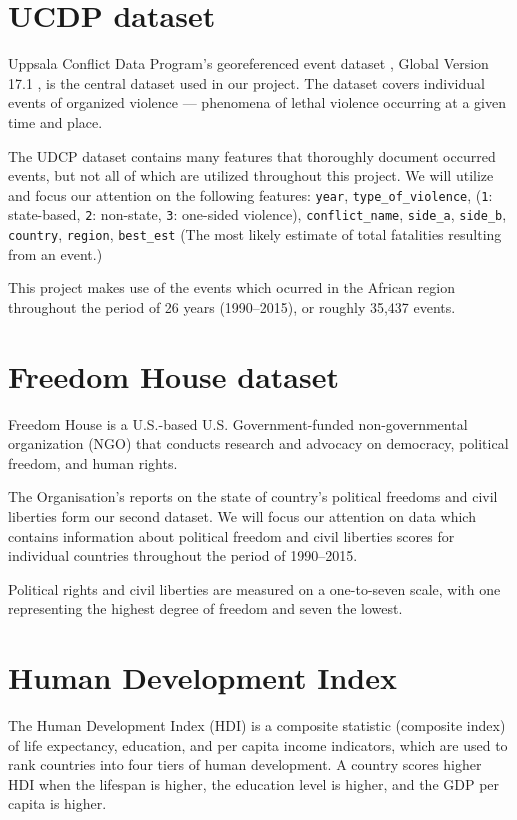 \documentclass[a4paper,11pt]{article}
\begin{document}
\section{UCDP dataset}

Uppsala Conflict Data Program's georeferenced event dataset \cite{Sundberg:13},
Global Version 17.1 \cite{Codebook2017}, is the central dataset used in our project.
The dataset covers individual events of organized violence --- phenomena of
lethal violence occurring at a given time and place.

The UDCP dataset contains many features that thoroughly document occurred
events, but not all of which are utilized throughout this project. We
will utilize and focus our attention on the following features:
\texttt{year}, \texttt{type\_of\_violence},
(\texttt{1}: state-based, \texttt{2}: non-state, \texttt{3}: one-sided violence),
\texttt{conflict\_name}, \texttt{side\_a}, \texttt{side\_b}, \texttt{country}, \texttt{region},
\texttt{best\_est} (The most likely estimate of total fatalities resulting from an event.)

This project makes use of the events which ocurred in the African region
throughout the period of 26 years (1990--2015), or roughly 35,437 events.

\section{Freedom House dataset}

Freedom House is a U.S.-based U.S. Government-funded non-governmental
organization (NGO) that conducts research and advocacy on democracy,
political freedom, and human rights.

The Organisation's reports on the state of country's political freedoms and
civil liberties form our second dataset.
We will focus our attention on data
which contains information about political freedom and civil liberties
scores for individual countries throughout the period of 1990--2015.

Political rights and civil liberties are measured on a one-to-seven
scale, with one representing the highest degree of freedom and seven the
lowest.

\section{Human Development Index}

The Human Development Index (HDI) is a composite statistic (composite
index) of life expectancy, education, and per capita income indicators,
which are used to rank countries into four tiers of human development. A
country scores higher HDI when the lifespan is higher, the education
level is higher, and the GDP per capita is higher.
\end{document}
